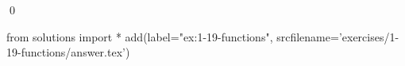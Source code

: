 
\begin{ex}
  \label{ex:1-19-functions}
  
  \qed
\end{ex}
\begin{python0}
from solutions import *
add(label="ex:1-19-functions",
    srcfilename='exercises/1-19-functions/answer.tex')
\end{python0}
